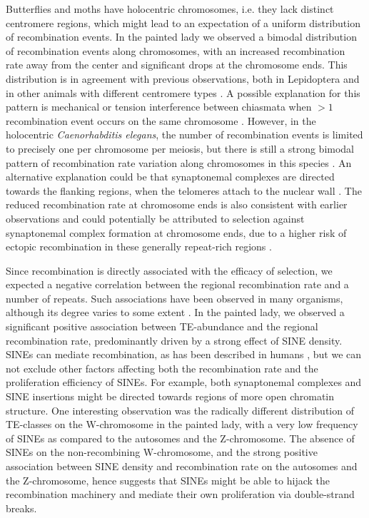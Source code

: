 \documentclass[twocolumn]{bmcart}%
\begin{document}
Butterflies and moths have holocentric chromosomes, i.e. they lack distinct centromere regions, which might lead to an expectation of a uniform distribution of recombination events. In the painted lady we observed a bimodal distribution of recombination events along chromosomes, with an increased recombination rate away from the center and significant drops at the chromosome ends. This distribution is in agreement with previous observations, both in Lepidoptera and in other animals with different centromere types \citep{haenelMetaanalysisChromosomescaleCrossover2018, martinRecombinationRateVariation2019}. A possible explanation for this pattern is mechanical or tension interference between chiasmata when $>1$ recombination event occurs on the same chromosome \citep{haenelMetaanalysisChromosomescaleCrossover2018}. However, in the holocentric \textit{Caenorhabditis elegans}, the number of recombination events is limited to precisely one per chromosome per meiosis, but there is still a strong bimodal pattern of recombination rate variation along chromosomes in this species \citep{barnesMeioticRecombinationNoncoding1995}. An alternative explanation could be that synaptonemal complexes are directed towards the flanking regions, when the telomeres attach to the nuclear wall \citep{scherthanCentromereTelomereMovements1996}. The reduced recombination rate at chromosome ends is also consistent with earlier observations and could potentially be attributed to selection against synaptonemal complex formation at chromosome ends, due to a higher risk of ectopic recombination in these generally repeat-rich regions \citep{smithNewSolutionsOld2020}.

Since recombination is directly associated with the efficacy of selection, we expected a negative correlation between the regional recombination rate and a number of repeats. Such associations have been observed in many organisms, although its degree varies to some extent \citep{kentCoevolutionTransposableElements2017, rizzonRecombinationRateDistribution2002}. In the painted lady, we observed a significant positive association between TE-abundance and the regional recombination rate, predominantly driven by a strong effect of SINE density. SINEs can mediate  recombination, as has been described in humans \citep{deiningerAluRepeatsHuman1999}, but we can not exclude other factors affecting both the recombination rate and the proliferation efficiency of SINEs. For example, both synaptonemal complexes and SINE insertions might be directed towards regions of more open chromatin structure. One interesting observation was the radically different distribution of TE-classes on the  W-chromosome in the painted lady, with a very low frequency of SINEs as compared to the autosomes and the Z-chromosome. The absence of SINEs on the non-recombining W-chromosome, and the strong positive association between SINE density and recombination rate on the autosomes and the Z-chromosome, hence suggests that SINEs might be able to hijack the recombination machinery and mediate their own proliferation via double-strand breaks. 
\end{document}
